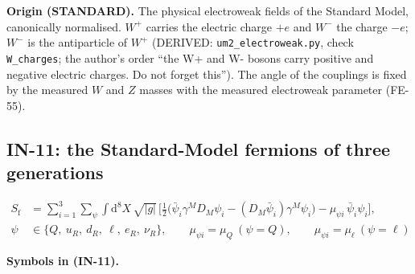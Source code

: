\documentclass[
  10pt,
]{article}
\begin{document}
\textbf{Origin (STANDARD).} The physical electroweak fields of the
Standard Model, canonically normalised. \(W^+\) carries the electric
charge \(+e\) and \(W^-\) the charge \(-e\); \(W^-\) is the antiparticle
of \(W^+\) (DERIVED: \texttt{um2\_electroweak.py}, check
\texttt{W\_charges}; the author's order ``the W+ and W- bosons carry
positive and negative electric charges. Do not forget this''). The angle
of the couplings is fixed by the measured \(W\) and \(Z\) masses with
the measured electroweak parameter (FE-55).

\hypertarget{in-11-the-standard-model-fermions-of-three-generations}{%
\subsection{IN-11: the Standard-Model fermions of three
generations}\label{in-11-the-standard-model-fermions-of-three-generations}}

\[
\begin{aligned}
S_{\mathrm{f}} &= \sum_{i=1}^{3}\sum_{\psi}\int\mathrm{d}^8X\,\sqrt{\lvert
 g\rvert}\,\Big[\tfrac12\big(\bar\psi_i\gamma^MD_M\psi_i
 - (D_M\bar\psi_i)\gamma^M\psi_i\big) - \mu_{\psi i}\,\bar\psi_i\psi_i\Big],\\
\psi &\in \{Q,\ u_R,\ d_R,\ \ell,\ e_R,\ \nu_R\},\qquad \mu_{\psi i} = \mu_Q\ (\psi = Q),\qquad
 \mu_{\psi i} = \mu_\ell\ (\psi = \ell)
\end{aligned} \tag{IN-11}
\]

\textbf{Symbols in (IN-11).}
\end{document}
